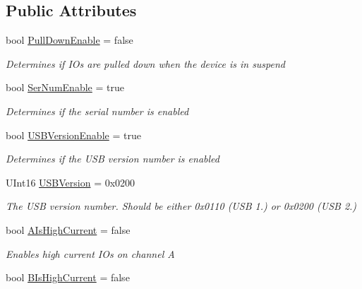 \subsection*{Public Attributes}
\begin{DoxyCompactItemize}
\item 
bool \mbox{\hyperlink{class_f_t_d2_x_x___n_e_t_1_1_f_t_d_i_1_1_f_t2232___e_e_p_r_o_m___s_t_r_u_c_t_u_r_e_a537acb8d3f5612a20693a9a6f8d8b257}{Pull\+Down\+Enable}} = false
\begin{DoxyCompactList}\small\item\em Determines if I\+Os are pulled down when the device is in suspend \end{DoxyCompactList}\item 
bool \mbox{\hyperlink{class_f_t_d2_x_x___n_e_t_1_1_f_t_d_i_1_1_f_t2232___e_e_p_r_o_m___s_t_r_u_c_t_u_r_e_ac54450750bbbd76865a576e8e7d386ef}{Ser\+Num\+Enable}} = true
\begin{DoxyCompactList}\small\item\em Determines if the serial number is enabled \end{DoxyCompactList}\item 
bool \mbox{\hyperlink{class_f_t_d2_x_x___n_e_t_1_1_f_t_d_i_1_1_f_t2232___e_e_p_r_o_m___s_t_r_u_c_t_u_r_e_a4c59d8b9f12d2e69ac1df8b65f5a6181}{U\+S\+B\+Version\+Enable}} = true
\begin{DoxyCompactList}\small\item\em Determines if the U\+SB version number is enabled \end{DoxyCompactList}\item 
U\+Int16 \mbox{\hyperlink{class_f_t_d2_x_x___n_e_t_1_1_f_t_d_i_1_1_f_t2232___e_e_p_r_o_m___s_t_r_u_c_t_u_r_e_a11544d67464cda25d84ebdb71cc33145}{U\+S\+B\+Version}} = 0x0200
\begin{DoxyCompactList}\small\item\em The U\+SB version number. Should be either 0x0110 (U\+SB 1.) or 0x0200 (U\+SB 2.) \end{DoxyCompactList}\item 
bool \mbox{\hyperlink{class_f_t_d2_x_x___n_e_t_1_1_f_t_d_i_1_1_f_t2232___e_e_p_r_o_m___s_t_r_u_c_t_u_r_e_a1bd484ae83ec245cee79e90d8c5c27c5}{A\+Is\+High\+Current}} = false
\begin{DoxyCompactList}\small\item\em Enables high current I\+Os on channel A \end{DoxyCompactList}\item 
bool \mbox{\hyperlink{class_f_t_d2_x_x___n_e_t_1_1_f_t_d_i_1_1_f_t2232___e_e_p_r_o_m___s_t_r_u_c_t_u_r_e_aa97a5f4f59ad7b03c7d331aaae1c5601}{B\+Is\+High\+Current}} = false

\end{DoxyCompactItemize}
